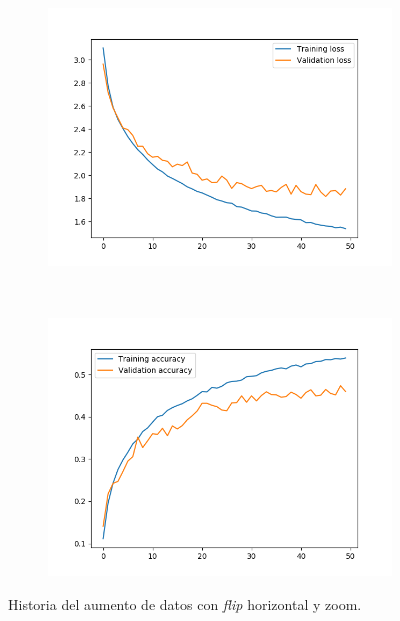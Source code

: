\documentclass[11pt,a4paper]{article}
\begin{document}
\begin{figure}[H]
  \begin{subfigure}{.5\textwidth}
    \includegraphics[scale=0.4]{img/aug-flipzoom-loss.png}
    \label{fig:aug-flipzoom-loss}
  \end{subfigure}%
  ~ \quad
  \begin{subfigure}{.5\textwidth}
    \includegraphics[scale=0.4]{img/aug-flipzoom-acc.png}
    \label{fig:aug-flipzoom-acc}
  \end{subfigure}
  \caption{Historia del aumento de datos con \textit{flip} horizontal y zoom.}
  \label{fig:history-aug-flipzoom}
\end{figure}
\end{document}
